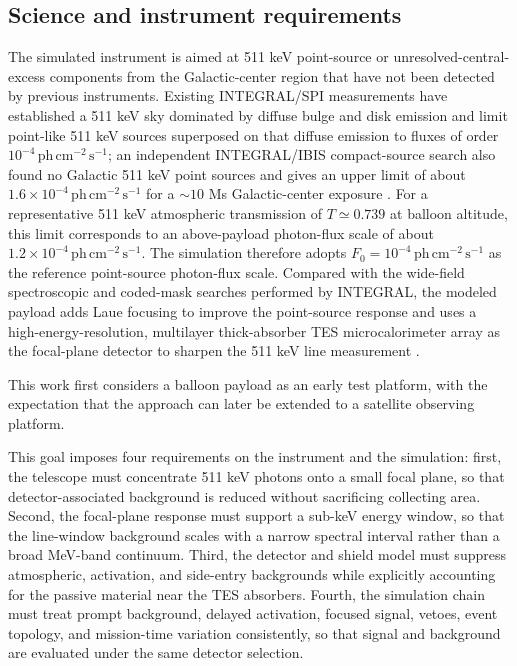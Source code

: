 \documentclass[pdflatex,sn-mathphys-num]{sn-jnl}
\newcommand{\phcms}{\,\mathrm{ph\,cm^{-2}\,s^{-1}}}
\newcommand{\fzero}{F_{0}}
\begin{document}
\subsection{Science and instrument requirements}
\label{sec:requirements}

The simulated instrument is aimed at 511 keV point-source or unresolved-central-excess components from the Galactic-center region that have not been detected by previous instruments. Existing INTEGRAL/SPI measurements have established a 511 keV sky dominated by diffuse bulge and disk emission and limit point-like 511 keV sources superposed on that diffuse emission to fluxes of order $10^{-4}\phcms$; an independent INTEGRAL/IBIS compact-source search also found no Galactic 511 keV point sources and gives an upper limit of about $1.6\times10^{-4}\phcms$ for a $\sim10$ Ms Galactic-center exposure \cite{Knodlseder2005AllSky,DeCesare2011}. For a representative 511 keV atmospheric transmission of $T\simeq0.739$ at balloon altitude, this limit corresponds to an above-payload photon-flux scale of about $1.2\times10^{-4}\phcms$. The simulation therefore adopts $\fzero=10^{-4}\phcms$ as the reference point-source photon-flux scale. Compared with the wide-field spectroscopic and coded-mask searches performed by INTEGRAL, the modeled payload adds Laue focusing to improve the point-source response and uses a high-energy-resolution, multilayer thick-absorber TES microcalorimeter array as the focal-plane detector to sharpen the 511 keV line measurement \cite{Shirazi2023,Caputo2017}.

This work first considers a balloon payload as an early test platform, with the expectation that the approach can later be extended to a satellite observing platform.

This goal imposes four requirements on the instrument and the simulation: first, the telescope must concentrate 511 keV photons onto a small focal plane, so that detector-associated background is reduced without sacrificing collecting area. Second, the focal-plane response must support a sub-keV energy window, so that the line-window background scales with a narrow spectral interval rather than a broad MeV-band continuum. Third, the detector and shield model must suppress atmospheric, activation, and side-entry backgrounds while explicitly accounting for the passive material near the TES absorbers. Fourth, the simulation chain must treat prompt background, delayed activation, focused signal, vetoes, event topology, and mission-time variation consistently, so that signal and background are evaluated under the same detector selection.
\end{document}
